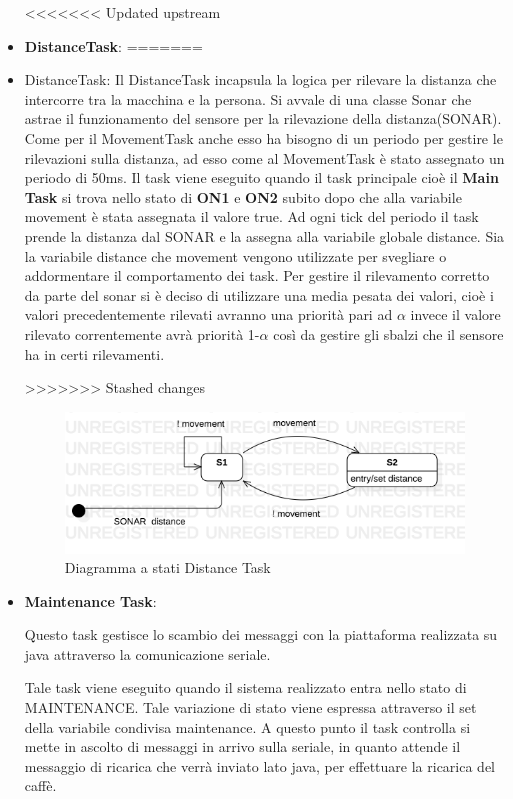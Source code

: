 \documentclass[a4paper]{article}
\begin{document}
\begin{itemize}
<<<<<<< Updated upstream
\item \textbf{DistanceTask}:
=======
\item {DistanceTask}:
Il DistanceTask incapsula la logica per rilevare la distanza che intercorre tra la macchina e la persona. Si avvale di una classe Sonar che astrae il funzionamento del sensore per la rilevazione della distanza(SONAR). Come per il MovementTask anche esso ha bisogno di un periodo per gestire le rilevazioni sulla distanza, ad esso come al MovementTask è stato assegnato un periodo di 50ms. 
Il task viene eseguito quando il task principale cioè il \textbf{Main Task} si trova nello stato di \textbf{ON1} e \textbf{ON2} subito dopo che alla variabile movement è stata assegnata il valore true.
Ad ogni tick del periodo il task prende la distanza dal SONAR e la assegna alla variabile globale distance. Sia la variabile distance che movement vengono utilizzate per svegliare o addormentare il comportamento dei task. Per gestire il rilevamento corretto da parte del sonar si è deciso di utilizzare una media pesata dei valori, cioè i valori precedentemente rilevati avranno una priorità pari ad $\alpha$ invece il valore rilevato correntemente avrà priorità 1-$\alpha$ così da gestire gli sbalzi che il sensore ha in certi rilevamenti.   

>>>>>>> Stashed changes

\begin{figure}[h!]
	\includegraphics[scale = 0.60]{DistanceTask.png}
	\caption{Diagramma a stati Distance Task}
\end{figure}

\newpage


\item \textbf{Maintenance Task}:

Questo task gestisce lo scambio dei messaggi con la piattaforma realizzata su java attraverso la comunicazione seriale.

Tale task viene eseguito quando il sistema realizzato entra nello stato di MAINTENANCE. Tale variazione di stato viene espressa attraverso il set della variabile condivisa maintenance.
A questo punto il task controlla si mette in ascolto di messaggi in arrivo sulla seriale, in quanto attende il messaggio di ricarica che verrà inviato lato java, per effettuare la ricarica del caffè.


\end{itemize}
\end{document}
